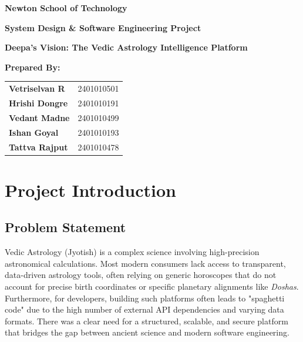 \documentclass[12pt,a4paper]{article}
\begin{document}
\begin{titlepage}
    \centering
    \vspace*{1cm}
    
    {\Huge \textbf{Newton School of Technology} \par}
    \vspace{1.5cm}
    
    {\Large \textbf{System Design \& Software Engineering Project} \par}
    \vspace{0.5cm}
    {\huge \textbf{Deepa's Vision: The Vedic Astrology Intelligence Platform} \par}
    
    \vspace{2.5cm}
    
    {\Large \textbf{Prepared By:} \par}
    \vspace{0.5cm}
    \begin{tabular}{ll}
        \textbf{Vetriselvan R} & 2401010501 \\
        \textbf{Hrishi Dongre} & 2401010191 \\
        \textbf{Vedant Madne} & 2401010499 \\
        \textbf{Ishan Goyal} & 2401010193 \\
        \textbf{Tattva Rajput} & 2401010478 \\
    \end{tabular}
    
    \vspace{2.5cm}

\end{titlepage}

\newpage
\tableofcontents
\newpage

\section{Project Introduction}

\subsection{Problem Statement}
Vedic Astrology (Jyotish) is a complex science involving high-precision astronomical calculations. Most modern consumers lack access to transparent, data-driven astrology tools, often relying on generic horoscopes that do not account for precise birth coordinates or specific planetary alignments like \textit{Doshas}. Furthermore, for developers, building such platforms often leads to "spaghetti code" due to the high number of external API dependencies and varying data formats. There was a clear need for a structured, scalable, and secure platform that bridges the gap between ancient science and modern software engineering.
\end{document}
